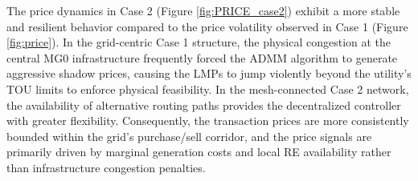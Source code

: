 \documentclass[preprint,12pt]{elsarticle}
\begin{document}
    The price dynamics in Case 2 (Figure \ref{fig:PRICE_case2}) exhibit a more stable and resilient behavior compared to the price volatility observed in Case 1 (Figure \ref{fig:price}). In the grid-centric Case 1 structure, the physical congestion at the central MG0 infrastructure frequently forced the ADMM algorithm to generate aggressive shadow prices, causing the LMPs to jump violently beyond the utility's TOU limits to enforce physical feasibility. In the mesh-connected Case 2 network, the availability of alternative routing paths provides the decentralized controller with greater flexibility. Consequently, the transaction prices are more consistently bounded within the grid's purchase/sell corridor, and the price signals are primarily driven by marginal generation costs and local RE availability rather than infrastructure congestion penalties.


\newpage
 






\end{document}
